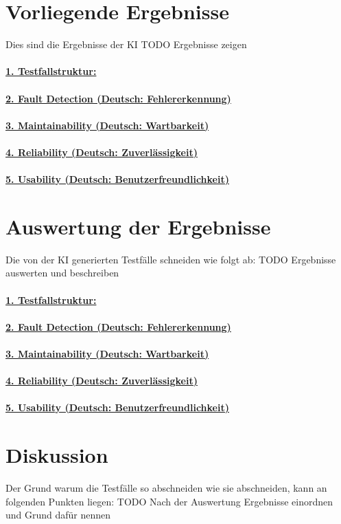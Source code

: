 \documentclass[12pt,toc=bib,toc=listof]{scrreprt}
\begin{document}
\section{Vorliegende Ergebnisse} %
\label{sec:vorliegendeErgebnisse}
Dies sind die Ergebnisse der KI
TODO Ergebnisse zeigen\\
\\\textbf{\underline{1. Testfallstruktur:}}\\
\\
\textbf{\underline{2. Fault Detection (Deutsch: Fehlererkennung)}}\\
\\
\textbf{\underline{3. Maintainability (Deutsch: Wartbarkeit)}}\\
\\
\textbf{\underline{4. Reliability (Deutsch: Zuverlässigkeit)}}\\
\\
\textbf{\underline{5. Usability (Deutsch: Benutzerfreundlichkeit)}}\\

\section{Auswertung der Ergebnisse} %
\label{sec:auswertungDerErgebnisse}
Die von der KI generierten Testfälle schneiden wie folgt ab:
TODO Ergebnisse auswerten und beschreiben\\
\\\textbf{\underline{1. Testfallstruktur:}}\\
\\
\textbf{\underline{2. Fault Detection (Deutsch: Fehlererkennung)}}\\
\\
\textbf{\underline{3. Maintainability (Deutsch: Wartbarkeit)}}\\
\\
\textbf{\underline{4. Reliability (Deutsch: Zuverlässigkeit)}}\\
\\
\textbf{\underline{5. Usability (Deutsch: Benutzerfreundlichkeit)}}\\

\section{Diskussion} %
\label{sec:diskussion}
Der Grund warum die Testfälle so abschneiden wie sie abschneiden, kann an folgenden Punkten liegen:
TODO Nach der Auswertung Ergebnisse einordnen und Grund dafür nennen
\end{document}
